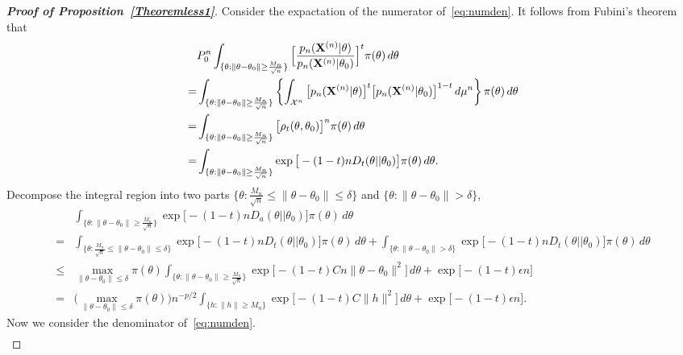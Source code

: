 \documentclass[3p]{elsarticle}
\theoremstyle{plain}
\theoremstyle{definition}
\theoremstyle{remark}
\begin{document}
\begin{appendices}
\begin{proof}[\textbf{Proof of Proposition~\ref{Theoremless1}}]
    Consider the expactation of the numerator of~\ref{eq:numden}.
    It follows from Fubini's theorem that
    $$
    \begin{aligned}
        &P_0^n\int_{\{\theta:\|\theta-\theta_0\|\geq \frac{M_n}{\sqrt{n}}\} } \Big[ \frac{p_n(\BX^{(n)}|\theta)}{p_n(\BX^{(n)}|\theta_0)}  \Big]^{t} \pi(\theta) \, d \theta
        \\
        =&
        \int_{\{\theta:\|\theta-\theta_0\|\geq \frac{M_n}{\sqrt{n}}\} } \left\{\int_{\mathcal{X}^n}\big[ {p_n} (\BX^{(n)}|\theta)\big]^t \big[ p_n (\BX^{(n)}|\theta_0) \big]^{1-t} \, d\mu^n \right\} \pi(\theta) \, d \theta\\
        =&
        \int_{\{\theta:\|\theta-\theta_0\|\geq \frac{M_n}{\sqrt{n}}\} } \big[ \rho_{t}(\theta,\theta_0) \big]^n \pi(\theta) \, d \theta\\
        = &
        \int_{\{\theta:\|\theta-\theta_0\|\geq \frac{M_n}{\sqrt{n}}\} } \exp \big[-(1-t) n D_t(\theta||\theta_0) \big] \pi(\theta) \, d \theta.
    \end{aligned}
    $$
    Decompose the integral region into two parts $\{\theta:\frac{M_n}{\sqrt{n}}\leq \|\theta-\theta_0\|\leq \delta \}$ and $\{\theta: \|\theta-\theta_0\|>\delta\}$, 
    $$
    \begin{aligned}
        &\int_{\{\theta:\|\theta-\theta_0\|\geq \frac{M_n}{\sqrt{n}}\} } 
        \exp \big[ -(1-t) {n} D_a(\theta||\theta_0) \big] \pi(\theta) \, d \theta
        \\
        =&\int_{\{\theta:\frac{M_n}{\sqrt{n}}\leq \|\theta-\theta_0\|\leq \delta \}}
        \exp\big[ -(1-t) {n} D_t(\theta||\theta_0) \big] \pi(\theta) \, d \theta+
        \int_{\{\theta: \|\theta-\theta_0\|>\delta\}} \exp\big[ -(1-t) {n} D_t(\theta||\theta_0) \big] \pi(\theta) \, d \theta
        \\
        \leq &
        \max_{\|\theta-\theta_0\|\leq \delta}\pi(\theta)
        \int_{\big\{\theta: \|\theta-\theta_0\|\geq \frac{M_n}{\sqrt{n}} \big\}}
        \exp\big[ -(1-t)C {n} \|\theta-\theta_0\|^2 \big]
        \, d \theta
        +
        \exp\big[ -(1-t)\epsilon n\big]
        \\
        =&
        \big(\max_{\|\theta-\theta_0\|\leq \delta}\pi(\theta)\big)
        n^{-p/2}\int_{\big\{h: \|h\|\geq M_n \big\}} \exp\big[-(1-t)C \|h\|^2 \big] \, d \theta
        +
        \exp\big[ -(1-t)\epsilon n\big].
    \end{aligned}
    $$
    Now we consider the denominator of~\eqref{eq:numden}.
    $$
    \begin{aligned}

\end{aligned}$$
\end{proof}
\end{appendices}
\end{document}
